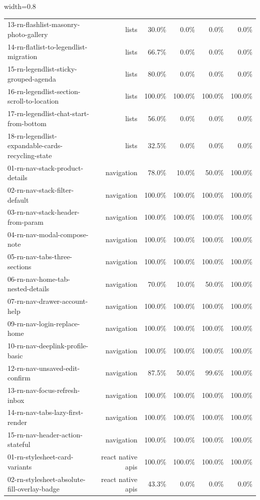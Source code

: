 \begin{table}[htbp]
\begin{adjustbox}{width=0.8\textwidth}
\begin{tabular}{lrrrrr}
13-rn-flashlist-masonry-photo-gallery & lists & 30.0\% & 0.0\% & 0.0\% & 0.0\% \\
14-rn-flatlist-to-legendlist-migration & lists & 66.7\% & 0.0\% & 0.0\% & 0.0\% \\
15-rn-legendlist-sticky-grouped-agenda & lists & 80.0\% & 0.0\% & 0.0\% & 0.0\% \\
16-rn-legendlist-section-scroll-to-location & lists & 100.0\% & 100.0\% & 100.0\% & 100.0\% \\
17-rn-legendlist-chat-start-from-bottom & lists & 56.0\% & 0.0\% & 0.0\% & 0.0\% \\
18-rn-legendlist-expandable-cards-recycling-state & lists & 32.5\% & 0.0\% & 0.0\% & 0.0\% \\
01-rn-nav-stack-product-details & navigation & 78.0\% & 10.0\% & 50.0\% & 100.0\% \\
02-rn-nav-stack-filter-default & navigation & 100.0\% & 100.0\% & 100.0\% & 100.0\% \\
03-rn-nav-stack-header-from-param & navigation & 100.0\% & 100.0\% & 100.0\% & 100.0\% \\
04-rn-nav-modal-compose-note & navigation & 100.0\% & 100.0\% & 100.0\% & 100.0\% \\
05-rn-nav-tabs-three-sections & navigation & 100.0\% & 100.0\% & 100.0\% & 100.0\% \\
06-rn-nav-home-tab-nested-details & navigation & 70.0\% & 10.0\% & 50.0\% & 100.0\% \\
07-rn-nav-drawer-account-help & navigation & 100.0\% & 100.0\% & 100.0\% & 100.0\% \\
09-rn-nav-login-replace-home & navigation & 100.0\% & 100.0\% & 100.0\% & 100.0\% \\
10-rn-nav-deeplink-profile-basic & navigation & 100.0\% & 100.0\% & 100.0\% & 100.0\% \\
12-rn-nav-unsaved-edit-confirm & navigation & 87.5\% & 50.0\% & 99.6\% & 100.0\% \\
13-rn-nav-focus-refresh-inbox & navigation & 100.0\% & 100.0\% & 100.0\% & 100.0\% \\
14-rn-nav-tabs-lazy-first-render & navigation & 100.0\% & 100.0\% & 100.0\% & 100.0\% \\
15-rn-nav-header-action-stateful & navigation & 100.0\% & 100.0\% & 100.0\% & 100.0\% \\
01-rn-stylesheet-card-variants & react native apis & 100.0\% & 100.0\% & 100.0\% & 100.0\% \\
02-rn-stylesheet-absolute-fill-overlay-badge & react native apis & 43.3\% & 0.0\% & 0.0\% & 0.0\% \\

\end{tabular}
\end{adjustbox}
\end{table}
